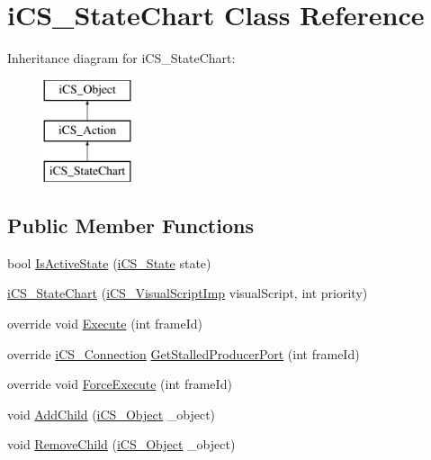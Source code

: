 \hypertarget{classi_c_s___state_chart}{\section{i\+C\+S\+\_\+\+State\+Chart Class Reference}
\label{classi_c_s___state_chart}
}
Inheritance diagram for i\+C\+S\+\_\+\+State\+Chart\+:\begin{figure}[H]
\begin{center}
\leavevmode
\includegraphics[height=3.000000cm]{classi_c_s___state_chart}
\end{center}
\end{figure}
\subsection*{Public Member Functions}
\begin{DoxyCompactItemize}
\item 
bool \hyperlink{classi_c_s___state_chart_af0bb130af46710428e75d9ff664f9882}{Is\+Active\+State} (\hyperlink{classi_c_s___state}{i\+C\+S\+\_\+\+State} state)
\item 
\hyperlink{classi_c_s___state_chart_a4deb017639d8a9652b4dd96ffd5021fb}{i\+C\+S\+\_\+\+State\+Chart} (\hyperlink{classi_c_s___visual_script_imp}{i\+C\+S\+\_\+\+Visual\+Script\+Imp} visual\+Script, int priority)
\item 
override void \hyperlink{classi_c_s___state_chart_a7318b55d56c66342cb4421c90638c282}{Execute} (int frame\+Id)
\item 
override \hyperlink{classi_c_s___connection}{i\+C\+S\+\_\+\+Connection} \hyperlink{classi_c_s___state_chart_acf9cb4baa28f9ad7225ae73c995fbeda}{Get\+Stalled\+Producer\+Port} (int frame\+Id)
\item 
override void \hyperlink{classi_c_s___state_chart_ab52a31f15b56063460e43250f9aeeb14}{Force\+Execute} (int frame\+Id)
\item 
void \hyperlink{classi_c_s___state_chart_a19900a085f5af391ec9ca54d03ec561a}{Add\+Child} (\hyperlink{classi_c_s___object}{i\+C\+S\+\_\+\+Object} \+\_\+object)
\item 
void \hyperlink{classi_c_s___state_chart_a6a67f5d5280f1cae65b3a2dc5d307c36}{Remove\+Child} (\hyperlink{classi_c_s___object}{i\+C\+S\+\_\+\+Object} \+\_\+object)
\end{DoxyCompactItemize}
